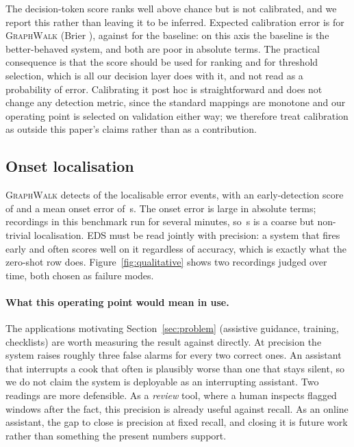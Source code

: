 \documentclass[10pt,twocolumn]{article}
\newcommand{\ourmodel}{\textsc{GraphWalk}}
\begin{document}
The decision-token score ranks well above chance but is not calibrated, and we
report this rather than leaving it to be inferred. Expected calibration error is
\resECE{} for \ourmodel{} (Brier \resBrier{}), against \baseECE{} for the
baseline: on this axis the baseline is the better-behaved system, and both are
poor in absolute terms. The practical consequence is that the score should be
used for ranking and for threshold selection, which is all our decision layer
does with it, and not read as a probability of error. Calibrating it post hoc
is straightforward and does not change any detection metric, since the standard
mappings are monotone and our operating point is selected on validation either
way; we therefore treat calibration as outside this paper's claims rather than
as a contribution.

\subsection{Onset localisation}

\ourmodel{} detects \resDet{} of the \resLoc{} localisable error events, with an
early-detection score of \resEDS{} and a mean onset error of \resMAE{}\,s. The
onset error is large in absolute terms; recordings in this benchmark run for
several minutes, so \resMAE{}\,s is a coarse but non-trivial localisation.
EDS must be read jointly with precision: a system that fires early and often
scores well on it regardless of accuracy, which is exactly what the zero-shot row
does. Figure~\ref{fig:qualitative} shows two recordings judged over time, both
chosen as failure modes.

\paragraph{What this operating point would mean in use.}
The applications motivating Section~\ref{sec:problem} (assistive guidance,
training, checklists) are worth measuring the result against directly. At
\resP{} precision the system raises roughly three false alarms for every two
correct ones. An assistant that interrupts a cook that often is plausibly worse
than one that stays silent, so we do not claim the system is deployable as an
interrupting assistant. Two readings are more defensible. As a \emph{review}
tool, where a human inspects flagged windows after the fact, this precision is
already useful against \resR{} recall. As an online assistant, the gap to close
is precision at fixed recall, and closing it is future work rather than something
the present numbers support.
\end{document}
